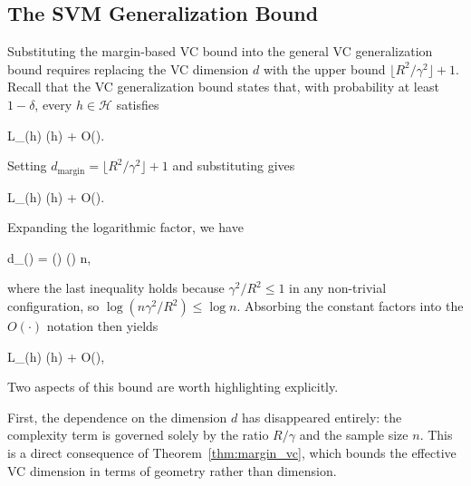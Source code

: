 \subsection*{The SVM Generalization Bound}

Substituting the margin-based VC bound into the general VC
generalization bound requires replacing the VC dimension $d$ with the
upper bound $\lfloor R^2/\gamma^2 \rfloor + 1$. Recall that the VC generalization bound states that,
with probability at least $1-\delta$, every $h \in \mathcal{H}$ satisfies
\begin{myequation*}
L_{}(h) \;\le\; (h) \;+\;
O\!\left(\right).
\end{myequation*}
Setting $d_{\mathrm{margin}} = \lfloor R^2/\gamma^2 \rfloor + 1$ and substituting gives
\begin{myequation*}
L_{}(h) \;\le\; (h) \;+\;
O\!\left(\right).
\end{myequation*}
Expanding the logarithmic factor, we have
\begin{myequation*}
d_{}\log\!\left(\right)
\;=\;
\left\lfloor{}\right\rfloor \log\!\left(\right)
\;\lesssim\;
\log\!\left(\right)
\;\le\;
\log n,
\end{myequation*}
where the last inequality holds because $\gamma^2/R^2 \le 1$ in any non-trivial
configuration, so $\log(n\gamma^2/R^2) \le \log n$. Absorbing the constant factors into the
$O(\cdot)$ notation then yields
\begin{myequation}
\label{eq:svm_gen_bound}
L_{}(h) \;\le\; (h) \;+\;
O\!\left(\right),
\end{myequation}
Two aspects of this bound are worth highlighting explicitly.

First, the dependence on the dimension $d$ has disappeared entirely: the complexity
term is governed solely by the ratio $R/\gamma$ and the sample size $n$. This is a direct
consequence of Theorem~\ref{thm:margin_vc}, which bounds the effective VC dimension in terms
of geometry rather than dimension.

